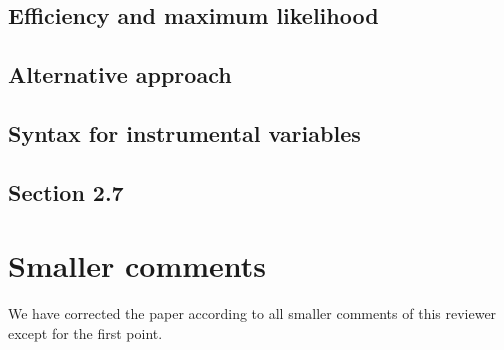 \documentclass[12pt,english]{scrartcl}
\begin{document}
\subsection{Efficiency and maximum likelihood}
% 

\subsection{Alternative approach}

\subsection{Syntax for instrumental variables}

\subsection{Section 2.7}

\section{Smaller comments}
We have corrected the paper according to all smaller comments of this reviewer
except for the first point.

% 
% 
\end{document}
